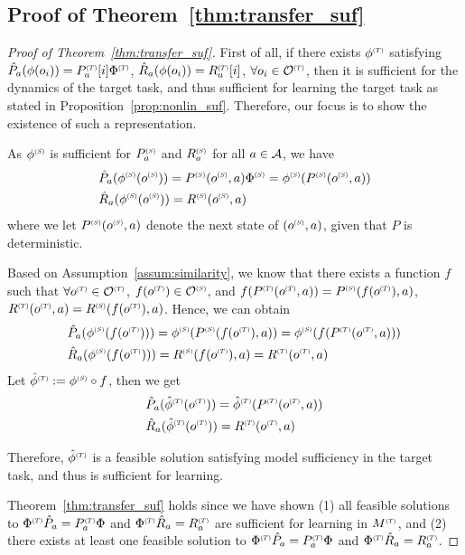 \subsection{Proof of Theorem~\ref{thm:transfer_suf}}
\label{proof:transfer_suf}

\begin{proof}[Proof of Theorem~\ref{thm:transfer_suf}]
First of all, if there exists $\phi\target$ satisfying
$\apa(\phi(o_i))=\pact\target[i]\rep\target$, $\ara(\phi(o_i)) = \ract\target[i]$, $\forall o_i\in\states\target$, then it is sufficient for the dynamics of the target task, and thus sufficient for learning the target task as stated in Proposition~\ref{prop:nonlin_suf}. Therefore, our focus is to show the existence of such a representation.

As $\phi\source$ is sufficient for $\pact\source$ and $\ract\source$ for all $a\in\mathcal{A}$, we have 
\begin{align}
    &\apa(\phi\source(o\source)) = P\source(o\source,a)\rep\source = \phi\source(P\source(o\source,a))\\
    &\ara(\phi\source(o\source)) = R\source(o\source,a)
\end{align}
where we let $P\source(o\source,a)$ denote the next state of $(o\source,a)$, given that $P$ is deterministic.

Based on Assumption~\ref{assum:similarity}, we know that there exists a function $f$ such that $\forall o\target\in\states\target$, $f(o\target)\in\states\source$, and $f(P\target(o\target,a))=P\source(f(o\target),a)$, $R\target(o\target,a)=R\source(f(o\target),a)$.
Hence, we can obtain 
\begin{align}
    &\apa(\phi\source(f(o\target))) = \phi\source(P\source(f(o\target),a)) = \phi\source(f(P\target(o\target,a)))\\
    &\ara(\phi\source(f(o\target))) = R\source(f(o\target),a) = R\target(o\target,a)
\end{align}
Let $\hat{\phi}\target := \phi\source\circ f$, then we get
\begin{align}
    &\apa(\hat{\phi}\target(o\target)) = \hat{\phi}\target (P\target(o\target,a))  \\
    &\ara(\hat{\phi}\target(o\target)) = R\target(o\target,a)
\end{align}

Therefore, $\hat{\phi}\target$ is a feasible solution satisfying model sufficiency in the target task, and thus is sufficient for learning.

Theorem~\ref{thm:transfer_suf} holds since we have shown (1) all feasible solutions to $\rep\target \apa = \pact\target \rep$ and $\rep\target \ara = \ract\target$ are sufficient for learning in $\mdp\target$, and (2) there exists at least one feasible solution to $\rep\target \apa = \pact\target \rep$ and $\rep\target \ara = \ract\target$.


\end{proof}
